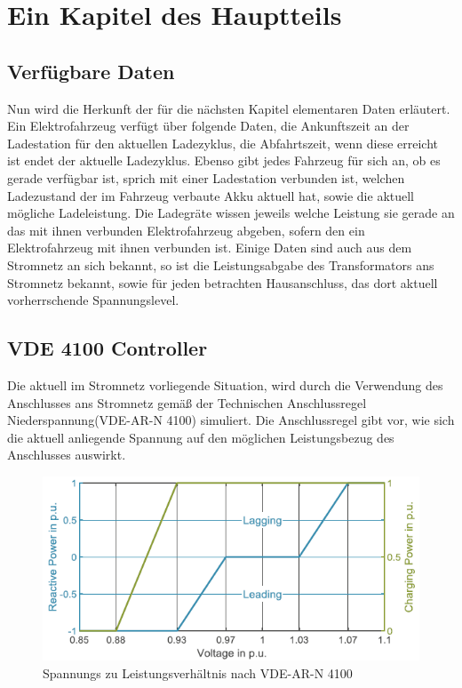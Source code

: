 \chapter{Ein Kapitel des Hauptteils}
\section{Verfügbare Daten}
\label{cap:background_sec:setting}
Nun wird die Herkunft der für die nächsten Kapitel elementaren Daten erläutert. Ein Elektrofahrzeug verfügt über folgende Daten, die Ankunftszeit an der Ladestation für den aktuellen Ladezyklus, die Abfahrtszeit, wenn diese erreicht ist endet der aktuelle Ladezyklus. Ebenso gibt jedes Fahrzeug für sich an, ob es gerade verfügbar ist, sprich mit einer Ladestation verbunden ist, welchen Ladezustand der im Fahrzeug verbaute Akku aktuell hat, sowie die aktuell mögliche Ladeleistung. Die Ladegräte wissen jeweils welche Leistung sie gerade an das mit ihnen verbunden Elektrofahrzeug abgeben, sofern den ein Elektrofahrzeug mit ihnen verbunden ist. Einige Daten sind auch aus dem Stromnetz an sich bekannt, so ist die Leistungsabgabe des Transformators ans Stromnetz bekannt, sowie für jeden betrachten Hausanschluss, das dort aktuell vorherrschende Spannungslevel.

\section{VDE 4100 Controller}
\label{cap:background_sec:pureVDE}
Die aktuell im Stromnetz vorliegende Situation, wird durch die Verwendung des Anschlusses ans Stromnetz gemäß der Technischen Anschlussregel Niederspannung(VDE-AR-N 4100) simuliert. Die Anschlussregel gibt vor, wie sich die aktuell anliegende Spannung auf den möglichen Leistungsbezug des Anschlusses auswirkt. \\
\begin{figure}[h!]
	\includegraphics[width=\linewidth]{img/VDEGraph.png}
	\caption{Spannungs zu Leistungsverhältnis nach VDE-AR-N 4100}
	\label{Abb_VDEController}
\end{figure}

